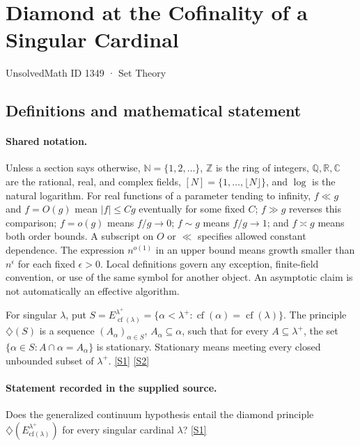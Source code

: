 \documentclass[11pt,a4paper]{article}
\newcommand{\N}{\mathbb{N}}
\newcommand{\Z}{\mathbb{Z}}
\newcommand{\Q}{\mathbb{Q}}
\newcommand{\R}{\mathbb{R}}
\newcommand{\C}{\mathbb{C}}
\newcommand{\sref}[2]{\hyperlink{source:#1:#2}{[S#2]}}
\begin{document}

\setcounter{section}{1348}

\section{Diamond at the Cofinality of a Singular Cardinal}\label{1349}

{\small\sffamily UnsolvedMath ID 1349 · Set Theory}

\subsection{Definitions and mathematical statement}

\paragraph{Shared notation.}Unless a section says otherwise, $\N=\{1,2,\ldots\}$,
$\Z$ is the ring of integers, $\Q,\R,\C$ are the rational, real, and complex
fields, $[N]=\{1,\ldots,\lfloor N\rfloor\}$, and $\log$ is the natural
logarithm. For real functions of a parameter tending to infinity,
$f\ll g$ and $f=O(g)$ mean $|f|\leq Cg$ eventually for some fixed $C$;
$f\gg g$ reverses this comparison; $f=o(g)$ means $f/g\to0$;
$f\sim g$ means $f/g\to1$; and $f\asymp g$ means both order bounds.
A subscript on $O$ or $\ll$ specifies allowed constant dependence.
The expression $n^{o(1)}$ in an upper bound means growth smaller than
$n^\epsilon$ for each fixed $\epsilon>0$. Local definitions govern any
exception, finite-field convention, or use of the same symbol for another
object. An asymptotic claim is not automatically an effective algorithm.



For singular $\lambda$, put $S=E_{\operatorname{cf}(\lambda)}^{\lambda^+}=\{\alpha<\lambda^+:\operatorname{cf}(\alpha)=\operatorname{cf}(\lambda)\}$. The principle $\diamondsuit(S)$ is a sequence $(A_\alpha)_{\alpha\in S}$, $A_\alpha\subseteq\alpha$, such that for every $A\subseteq\lambda^+$, the set $\{\alpha\in S:A\cap\alpha=A_\alpha\}$ is stationary. Stationary means meeting every closed unbounded subset of $\lambda^+$. \sref{1349}{1} \sref{1349}{2}

\paragraph{Statement recorded in the supplied source.}
Does the generalized continuum hypothesis entail the diamond principle $\diamondsuit(E_{\text{cf}(\lambda)}^{\lambda^+})$ for every singular cardinal $\lambda$? \sref{1349}{1}
\end{document}
